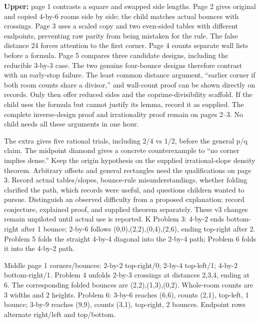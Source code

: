 \documentclass[11pt]{article}
\begin{document}
\textbf{Upper:} page 1 contrasts a square and swapped side lengths. Page 2 gives original and copied 4-by-6 rooms side by side; the child matches actual bounces with crossings. Page 3 uses a scaled copy and two even-sided tables with different endpoints, preventing raw parity from being mistaken for the rule. The false distance 24 forces attention to the first corner. Page 4 counts separate wall lists before a formula. Page 5 compares three candidate designs, including the reducible 3-by-3 case. The two genuine four-bounce designs therefore contrast with an early-stop failure.
The least common distance argument, ``earlier corner if both room counts share a divisor,'' and wall-count proof can be shown directly on records. Only then offer reduced sides and the coprime-divisibility scaffold. If the child uses the formula but cannot justify its lemma, record it as supplied. The complete inverse-design proof and irrationality proof remain on pages 2--3. No child needs all these arguments in one hour.

The extra gives five rational trials, including 2/4 vs 1/2, before the general p/q claim. The midpoint diamond gives a concrete counterexample to ``no corner implies dense.'' Keep the origin hypothesis on the supplied irrational-slope density theorem. Arbitrary offsets and general rectangles need the qualifications on page 3.
Record actual tables/slopes, bounce-rule misunderstandings, whether folding clarified the path, which records were useful, and questions children wanted to pursue. Distinguish an observed difficulty from a proposed explanation; record conjecture, explained proof, and supplied theorem separately. These v3 changes remain unpiloted until actual use is reported.
\newpage
{}
K Problem 3: 4-by-2 ends bottom-right after 1 bounce; 2-by-6 follows (0,0),(2,2),(0,4),(2,6), ending top-right after 2. Problem 5 folds the straight 4-by-4 diagonal into the 2-by-4 path; Problem 6 folds it into the 4-by-2 path.

Middle page 1 corners/bounces: 2-by-2 top-right/0; 2-by-4 top-left/1; 4-by-2 bottom-right/1. Problem 4 unfolds 2-by-3 crossings at distances 2,3,4, ending at 6. The corresponding folded bounces are (2,2),(1,3),(0,2). Whole-room counts are 3 widths and 2 heights. Problem 6: 3-by-6 reaches (6,6), counts (2,1), top-left, 1 bounce; 3-by-9 reaches (9,9), counts (3,1), top-right, 2 bounces. Endpoint rows alternate right/left and top/bottom.
\end{document}
